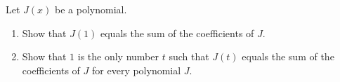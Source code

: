Let $J(x)$ be a polynomial.
\begin{enumerate}
\item[(a)] Show that $J(1)$ equals the sum of the coefficients of $J$.
\item[(b)] Show that $1$ is the only number $t$ such that $J(t)$ equals the sum of the coefficients of $J$ for every polynomial $J$.
\end{enumerate}
